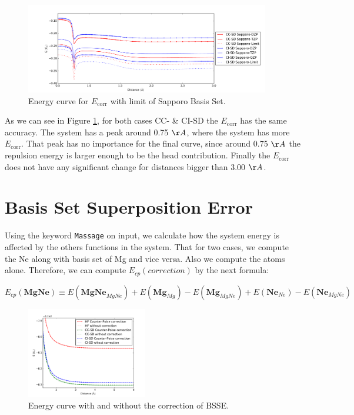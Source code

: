 \begin{figure}%
    \centering
    \includegraphics[width=0.95\textwidth]{./img/plots/basis_limit_.pdf}
    \caption{Energy curve for $E\mathrm{_{corr}}$ with limit of Sapporo Basis Set.}
\label{Ecorr}
\end{figure}

\newpage

As we can see in Figure \ref{Ecorr}, for both cases CC- \& CI-SD the $E_{\mathrm{corr}}$ has the same
accuracy. The system has a peak around 0.75 $\AA$, where the system has more
$E_{\mathrm{corr}}$. That peak has no importance for the final
curve, since around 0.75 $\AA$ the repulsion energy is larger enough to be
the head contribution. Finally the $E_{\mathrm{corr}}$ does not have any
significant change for distances bigger than 3.00 $\AA$.

\section{\textbf{Basis Set Superposition Error}}

Using the keyword \texttt{Massage} on {} input, we calculate how
the system energy is affected by the others functions in the system. That for
two cases, we compute the Ne along with basis set of Mg and vice versa.
Also we compute the atoms alone. Therefore, we can compute $E_{cp} (correction)$ by the next
formula:

$$
E_{cp} (\mathrm{\mathbf{MgNe}}) \equiv E(\mathrm{\mathbf{MgNe}}_{MgNe}) + E(\mathrm{\mathbf{Mg}}_{Mg}) - E(\mathrm{\mathbf{Mg}}_{MgNe})
+ E(\mathrm{\mathbf{Ne}}_{Ne}) - E(\mathrm{\mathbf{Ne}}_{MgNe})
$$

\begin{figure}
    \centering
    \includegraphics[width=0.47\textwidth]{./img/plots/bsse.pdf}
    \caption{Energy curve with and without the correction of BSSE.}
\label{BSSE}
\end{figure}

